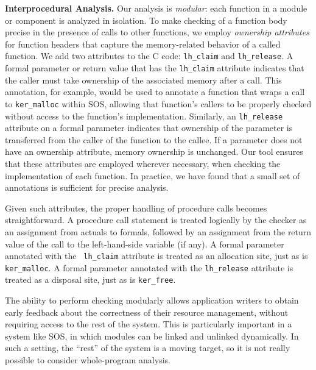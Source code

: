\smallskip\noindent
{\bf Interprocedural Analysis.}
Our analysis is {\em modular}:  each function in a module or component
is analyzed in isolation.  To make checking of a function body precise
in the presence of calls to other functions, we employ {\em ownership
attributes} for function headers that capture the memory-related
behavior of a called function.  We add two attributes to the C code:
{\tt lh\_claim} and {\tt lh\_release}.  A formal parameter or return
value that has the {\tt lh\_claim} attribute indicates that the caller
must take ownership of the associated memory after a call.  This
annotation, for example, would be used to annotate a function that
wraps a call to {\tt ker\_malloc} within SOS, allowing that function's
callers to be properly checked without access to the function's
implementation.  Similarly, an {\tt lh\_release} attribute on a formal
parameter indicates that ownership of the parameter is transferred
from the caller of the function to the callee.  If a parameter does
not have an ownership attribute, memory ownership is unchanged.  Our
tool ensures that these attributes are employed wherever necessary,
when checking the implementation of each function.  In practice, we
have found that a small set of annotations is sufficient for precise
analysis.


Given such attributes, the proper handling of procedure calls becomes
straightforward.  A procedure call statement is treated logically by
the checker as an assignment from actuals to formals, followed by an
assignment from the return value of the call to the left-hand-side
variable (if any).  A formal parameter annotated with the {\tt
lh\_claim} attribute is treated as an allocation site, just as is {\tt
ker\_malloc}.  A formal parameter annotated with the {\tt lh\_release}
attribute is treated as a disposal site, just as is {\tt ker\_free}.

The ability to perform checking modularly allows application writers
to obtain early feedback about the correctness of their resource
management, without requiring access to the rest of the system.  This
is particularly important in a system like SOS, in which modules can
be linked and unlinked dynamically.  In such a setting, the ``rest''
of the system is a moving target, so it is not really possible to
consider whole-program analysis.



